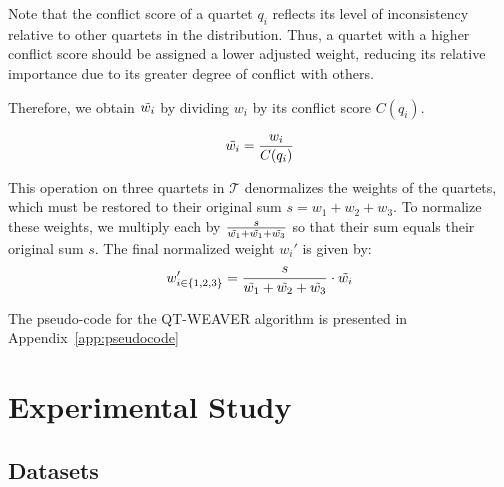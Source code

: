 \documentclass[runningheads]{llncs}
\newcommand{\addb}[1]{{\color{red} #1}}
\begin{document}

\addb{Note that the conflict score of a quartet $q_i$ reflects its level of inconsistency relative to other quartets in the distribution. Thus, a quartet with a higher conflict score should be assigned a lower adjusted weight, reducing its relative importance due to its greater degree of conflict with others.}


Therefore, we obtain $\Tilde{w_i}$ by dividing $ w_i $ %
by its conflict score $C(q_i)$.

$$
\Tilde{w_i} = \frac{w_i}{C(q_i)}
$$

This operation on three quartets in $\mathcal{T}$ denormalizes the weights of the quartets, which must be restored to their original sum $s = w_1+w_2+w_3$. %
To normalize these weights, we multiply each by $\frac{s}{\Tilde{w_1} + \Tilde{w_1} + \Tilde{w_3}}$ so that their sum equals their original sum $s$. The final normalized weight $w_i'$ is given by:
$$
w_{i \in \{1,2,3\}}'  = \frac{ s }{\Tilde{w_1} + \Tilde{w_2} + \Tilde{w_3}} \cdot \Tilde{w_i}
$$


The pseudo-code for the QT-WEAVER algorithm is presented in Appendix~\ref{app:pseudocode}


\section{Experimental Study}
\subsection{Datasets}
%
\end{document}
